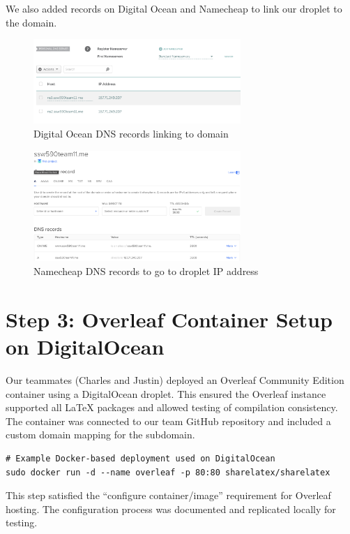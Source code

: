 We also added records on Digital Ocean and Namecheap to link our droplet to the domain.

\begin{figure}[H]
    \centering
    \includegraphics[width=0.7\textwidth]{png/DigitalOcean/DigitalOceanDNS.png}
    \caption{Digital Ocean DNS records linking to domain}
\end{figure}

\begin{figure}[H]
    \centering
    \includegraphics[width=0.7\textwidth]{png/DigitalOcean/NamecheapRecords.png}
    \caption{Namecheap DNS records to go to droplet IP address}
\end{figure}

\section{Step 3: Overleaf Container Setup on DigitalOcean}
Our teammates (Charles and Justin) deployed an Overleaf Community Edition container using a DigitalOcean droplet.  
This ensured the Overleaf instance supported all LaTeX packages and allowed testing of compilation consistency.  
The container was connected to our team GitHub repository and included a custom domain mapping for the subdomain.

\begin{verbatim}
# Example Docker-based deployment used on DigitalOcean
sudo docker run -d --name overleaf -p 80:80 sharelatex/sharelatex
\end{verbatim}

This step satisfied the “configure container/image” requirement for Overleaf hosting.  
The configuration process was documented and replicated locally for testing.

